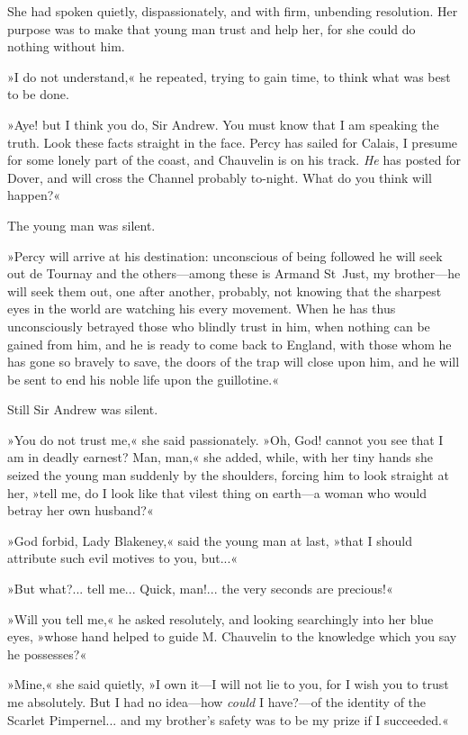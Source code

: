 She had spoken quietly, dispassionately, and with firm, unbending resolution. Her purpose was to make that young man trust and help her, for she could do nothing without him.

»I do not understand,« he repeated, trying to gain time, to think what was best to be done.

»Aye! but I think you do, Sir Andrew. You must know that I am speaking the truth. Look these facts straight in the face. Percy has sailed for Calais, I presume for some lonely part of the coast, and Chauvelin is on his track. \textit{He} has posted for Dover, and will cross the Channel probably to-night. What do you think will happen?«

The young man was silent.

»Percy will arrive at his destination: unconscious of being followed he will seek out de Tournay and the others\allowbreak---\allowbreak among these is Armand St~Just, my brother\allowbreak---\allowbreak he will seek them out, one after another, probably, not knowing that the sharpest eyes in the world are watching his every movement. When he has thus unconsciously betrayed those who blindly trust in him, when nothing can be gained from him, and he is ready to come back to England, with those whom he has gone so bravely to save, the doors of the trap will close upon him, and he will be sent to end his noble life upon the guillotine.«

Still Sir Andrew was silent.

»You do not trust me,« she said passionately. »Oh, God! cannot you see that I am in deadly earnest? Man, man,« she added, while, with her tiny hands she seized the young man suddenly by the shoulders, forcing him to look straight at her, »tell me, do I look like that vilest thing on earth\allowbreak---\allowbreak a woman who would betray her own husband?«

»God forbid, Lady Blakeney,« said the young man at last, »that I should attribute such evil motives to you, but...«

»But what?... tell me... Quick, man!... the very seconds are precious!«

»Will you tell me,« he asked resolutely, and looking searchingly into her blue eyes, »whose hand helped to guide M. Chauvelin to the knowledge which you say he possesses?«

»Mine,« she said quietly, »I own it\allowbreak---\allowbreak I will not lie to you, for I wish you to trust me absolutely. But I had no idea\allowbreak---\allowbreak how \textit{could} I have?\allowbreak---\allowbreak of the identity of the Scarlet Pimpernel... and my brother's safety was to be my prize if I succeeded.«


